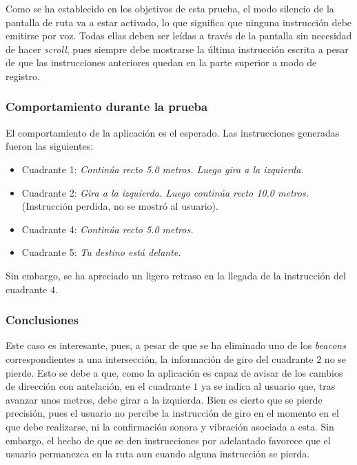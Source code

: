 Como se ha establecido en los objetivos de esta prueba, el modo silencio de la pantalla de ruta va a estar activado, lo que significa que ninguna instrucción debe emitirse por voz. Todas ellas deben ser leídas a través de la pantalla sin necesidad de hacer \textit{scroll}, pues siempre debe mostrarse la última instrucción escrita a pesar de que las instrucciones anteriores quedan en la parte superior a modo de registro. 


\subsubsection*{Comportamiento durante la prueba}

El comportamiento de la aplicación es el esperado. Las instrucciones generadas fueron las siguientes: 


\begin{itemize}
	\item Cuadrante 1: \textit{Continúa recto 5.0 metros. Luego gira a la izquierda.}
	
	\item Cuadrante 2: \textit{Gira a la izquierda. Luego continúa recto 10.0 metros.} (Instrucción perdida, no se mostró al usuario).
	
	\item Cuadrante 4: \textit{Continúa recto 5.0 metros.}
	
	\item Cuadrante 5: \textit{Tu destino está delante.}
	
\end{itemize}


Sin embargo, se ha apreciado un ligero retraso en la llegada de la instrucción del cuadrante $4$. 

 
\subsubsection*{Conclusiones}

Este caso es interesante, pues, a pesar de que se ha eliminado uno de los \textit{beacons} correspondientes a una intersección, la información de giro del cuadrante $2$ no se pierde. Esto se debe a que, como la aplicación es capaz de avisar de los cambios de dirección con antelación, en el cuadrante $1$ ya se indica al usuario que, tras avanzar unos metros, debe girar a la izquierda. Bien es cierto que se pierde precisión, pues el usuario no percibe la instrucción de giro en el momento en el que debe realizarse, ni la confirmación sonora y vibración asociada a esta. Sin embargo, el hecho de que se den instrucciones por adelantado favorece que el usuario permanezca en la ruta aun cuando alguna instrucción se pierda. 

